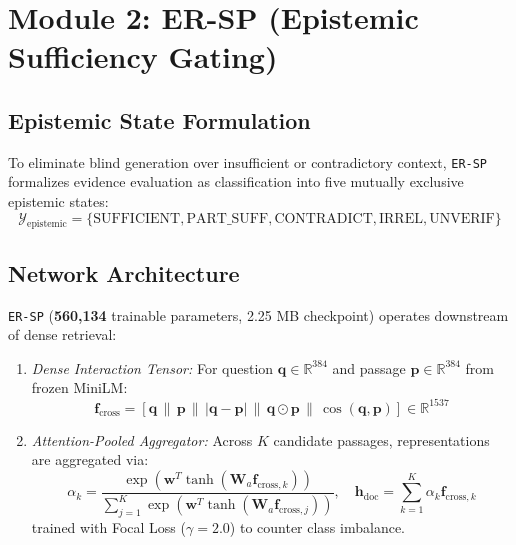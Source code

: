 \documentclass[conference]{IEEEtran}
\begin{document}
\section{Module 2: ER-SP (Epistemic Sufficiency Gating)}
\subsection{Epistemic State Formulation}
To eliminate blind generation over insufficient or contradictory context, \texttt{ER-SP} formalizes evidence evaluation as classification into five mutually exclusive epistemic states:
\begin{equation}
\mathcal{Y}_{\text{epistemic}} = \{\text{SUFFICIENT}, \text{PART\_SUFF}, \text{CONTRADICT}, \text{IRREL}, \text{UNVERIF}\}
\end{equation}

\subsection{Network Architecture}
\texttt{ER-SP} (\textbf{560,134} trainable parameters, 2.25 MB checkpoint) operates downstream of dense retrieval:
\begin{enumerate}
    \item \textit{Dense Interaction Tensor:} For question $\mathbf{q} \in \mathbb{R}^{384}$ and passage $\mathbf{p} \in \mathbb{R}^{384}$ from frozen MiniLM:
    \begin{equation}
    \mathbf{f}_{\text{cross}} = \left[ \mathbf{q} \,\|\, \mathbf{p} \,\|\, |\mathbf{q} - \mathbf{p}| \,\|\, \mathbf{q} \odot \mathbf{p} \,\|\, \cos(\mathbf{q}, \mathbf{p}) \right] \in \mathbb{R}^{1537}
    \end{equation}
    \item \textit{Attention-Pooled Aggregator:} Across $K$ candidate passages, representations are aggregated via:
    \begin{equation}
    \alpha_k = \frac{\exp(\mathbf{w}^T \tanh(\mathbf{W}_a \mathbf{f}_{\text{cross}, k}))}{\sum_{j=1}^K \exp(\mathbf{w}^T \tanh(\mathbf{W}_a \mathbf{f}_{\text{cross}, j}))}, \quad \mathbf{h}_{\text{doc}} = \sum_{k=1}^K \alpha_k \mathbf{f}_{\text{cross}, k}
    \end{equation}
    trained with Focal Loss ($\gamma = 2.0$) to counter class imbalance.
\end{enumerate}
\end{document}
